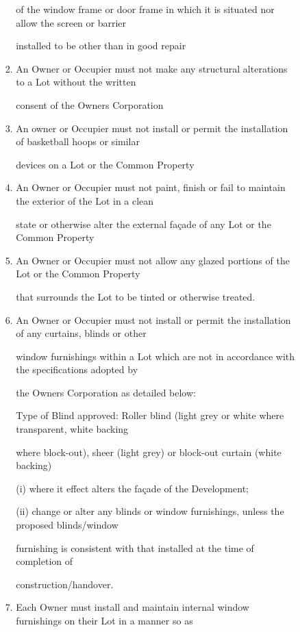 \documentclass{article}
\begin{document}
\begin{enumerate}[label=\arabic*.]
\begin{enumerate}[label=\arabic{enumi}.\arabic*.]
\begin{enumerate}[label=(\arabic*)]
\begin{enumerate}[label=(\alph*)]
of the window frame or door frame in which it is situated nor allow the screen or barrier 

installed to be other than in good repair 

\item  An Owner or Occupier must not make any structural alterations to a Lot without the written 

consent of the Owners Corporation 

\item  An owner or Occupier must not install or permit the installation of basketball hoops or similar 

devices on a Lot or the Common Property 

\newpage

\item  An Owner or Occupier must not paint, finish or fail to maintain the exterior of the Lot in a clean 

state or otherwise alter the external façade of any Lot or the Common Property 

\item  An Owner or Occupier must not allow any glazed portions of the Lot or the Common Property 

that surrounds the Lot to be tinted or otherwise treated. 

\item  An Owner or Occupier must not install or permit the installation of any curtains, blinds or other 

window furnishings within a Lot which are not in accordance with the specifications adopted by 

the Owners Corporation as detailed below: 

Type of Blind approved: Roller blind (light grey or white where transparent, white backing 

where block-out), sheer (light grey) or block-out curtain (white backing)  

(i) where it effect alters the façade of the Development; 

(ii) change or alter any blinds or window furnishings, unless the proposed blinds/window 

furnishing is consistent with that installed at the time of completion of 

construction/handover. 

\item  Each Owner must install and maintain internal window furnishings on their Lot in a manner so as 


\end{enumerate}
\end{enumerate}
\end{enumerate}
\end{enumerate}
\end{document}
